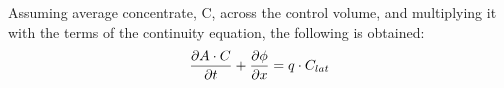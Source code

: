 Assuming average concentrate, C, across the control volume, and multiplying it with the terms of the continuity equation, the following is obtained:
\begin{equation}
	\frac{\partial A \cdot C}{\partial t} + \frac{\partial \phi}{\partial x}=q \cdot C_{lat} \\
\label{poop_mass_equation}
\end{equation}










